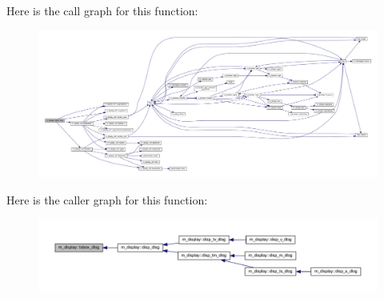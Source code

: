 Here is the call graph for this function\+:
\nopagebreak
\begin{figure}[H]
\begin{center}
\leavevmode
\includegraphics[width=350pt]{namespacem__display_abaf23628781d863ca3d9bba0b3b01707_cgraph}
\end{center}
\end{figure}
Here is the caller graph for this function\+:
\nopagebreak
\begin{figure}[H]
\begin{center}
\leavevmode
\includegraphics[width=350pt]{namespacem__display_abaf23628781d863ca3d9bba0b3b01707_icgraph}
\end{center}
\end{figure}
\mbox{\label{namespacem__display_a880ae5ed1f32412fadb1d1b91d406218}} 
